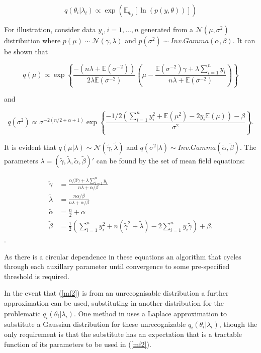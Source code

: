 \documentclass[12pt,a4paper]{article}%
\numberwithin{equation}{section}
\begin{document}
\begin{equation}
\label{mf2}
q(\theta_i | \lambda_i) \propto\exp( \mathbb{E}_{q_{\setminus i}} [\ln(p(y,\theta))])
\end{equation}

For illustration, consider data $y_i, i = 1, \dots, n$ generated from a $\mathcal{N}(\mu, \sigma^2)$ distribution where $p(\mu) \sim \mathcal{N}(\gamma, \lambda)$ and $p(\sigma^2) \sim Inv.Gamma(\alpha, \beta)$. It can be shown that

\begin{equation}
\label{mf3}
q(\mu) \propto \exp \left\{ \frac{-(n\lambda + \mathbb{E}(\sigma^{-2}))}{2\lambda\mathbb{E}(\sigma^{-2})} \left( \mu - \frac{\mathbb{E}(\sigma^{-2})\gamma + \lambda \sum_{i=1}^{n} y_i}{n \lambda + \mathbb{E}(\sigma^{-2})} \right) \right\}
\end{equation}

and

\begin{equation}
\label{mf4}
q(\sigma^2) \propto \sigma^{-2(n/2 + \alpha + 1)} \exp \left\{ \frac{ -1/2(\sum_{i=1}^{n}y_i^2 + \mathbb{E}(\mu^2) - 2 y_i \mathbb{E}(\mu)) - \beta}{\sigma^2} \right\}.
\end{equation}

It is evident that $q(\mu | \lambda) \sim \mathcal{N}(\tilde{\gamma}, \tilde{\lambda})$ and $q(\sigma^2 | \lambda) \sim Inv.Gamma(\tilde{\alpha}, \tilde{\beta})$. The parameters $\lambda = (\tilde{\gamma}, \tilde{\lambda}, \tilde{\alpha}, \tilde{\beta})'$ can be found by the set of mean field equations:

\begin{align}
\tilde{\gamma} &= \frac{\alpha / \beta \gamma + \lambda \sum_{i=1}^{n} y_i} {n \lambda + \alpha / \beta} \label{mf5} \\ 
\tilde{\lambda} &= \frac{n \alpha / \beta}{n \lambda + \alpha / \beta} \\
\tilde{\alpha} &= \frac{n}{2} + \alpha \\
\tilde{\beta} &= \frac{1}{2} \left(\sum_{i=1}^{n} y_i^2 + n(\tilde{\gamma}^2 + \tilde{\lambda}) - 2 \sum_{i=1}^{n} y_i \tilde{\gamma} \right) + \beta. \label{mf6}
\end{align}.

As there is a circular dependence in these equations an algorithm that cycles through each auxillary parameter until convergence to some pre-specified threshold is required.

In the event that (\ref{mf2}) is from an unrecognisable distribution a further approximation can be used, substituting in another distribution for the problematic $\tilde{q_i(\theta_i|\lambda_i)}.$ One method in \citet{Friston2006} uses a Laplace approximation to substitute a Gaussian distribution for these unrecognizable $q_i(\theta_i | \lambda_i)$, though the only requirement is that the substitute has an expectation that is a tractable function of its parameters to be used in (\ref{mf2}). 
\end{document}
